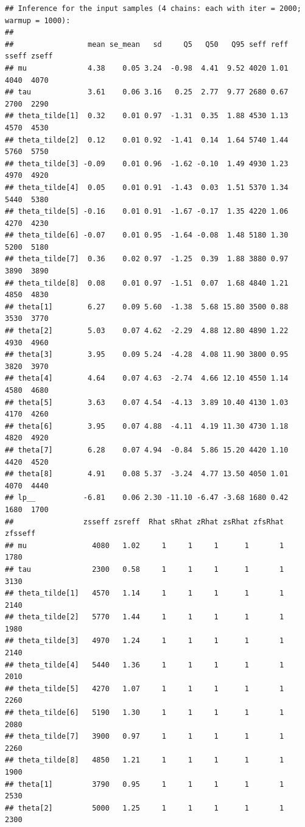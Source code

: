 \documentclass[american,]{article}
\begin{document}
\begin{verbatim}
## Inference for the input samples (4 chains: each with iter = 2000; warmup = 1000):
## 
##                 mean se_mean   sd     Q5   Q50   Q95 seff reff sseff zseff
## mu              4.38    0.05 3.24  -0.98  4.41  9.52 4020 1.01  4040  4070
## tau             3.61    0.06 3.16   0.25  2.77  9.77 2680 0.67  2700  2290
## theta_tilde[1]  0.32    0.01 0.97  -1.31  0.35  1.88 4530 1.13  4570  4530
## theta_tilde[2]  0.12    0.01 0.92  -1.41  0.14  1.64 5740 1.44  5760  5750
## theta_tilde[3] -0.09    0.01 0.96  -1.62 -0.10  1.49 4930 1.23  4970  4920
## theta_tilde[4]  0.05    0.01 0.91  -1.43  0.03  1.51 5370 1.34  5440  5380
## theta_tilde[5] -0.16    0.01 0.91  -1.67 -0.17  1.35 4220 1.06  4270  4230
## theta_tilde[6] -0.07    0.01 0.95  -1.64 -0.08  1.48 5180 1.30  5200  5180
## theta_tilde[7]  0.36    0.02 0.97  -1.25  0.39  1.88 3880 0.97  3890  3890
## theta_tilde[8]  0.08    0.01 0.97  -1.51  0.07  1.68 4840 1.21  4850  4830
## theta[1]        6.27    0.09 5.60  -1.38  5.68 15.80 3500 0.88  3530  3770
## theta[2]        5.03    0.07 4.62  -2.29  4.88 12.80 4890 1.22  4930  4960
## theta[3]        3.95    0.09 5.24  -4.28  4.08 11.90 3800 0.95  3820  3970
## theta[4]        4.64    0.07 4.63  -2.74  4.66 12.10 4550 1.14  4580  4680
## theta[5]        3.63    0.07 4.54  -4.13  3.89 10.40 4130 1.03  4170  4260
## theta[6]        3.95    0.07 4.88  -4.11  4.19 11.30 4730 1.18  4820  4920
## theta[7]        6.28    0.07 4.94  -0.84  5.86 15.20 4420 1.10  4420  4520
## theta[8]        4.91    0.08 5.37  -3.24  4.77 13.50 4050 1.01  4070  4440
## lp__           -6.81    0.06 2.30 -11.10 -6.47 -3.68 1680 0.42  1680  1700
##                zsseff zsreff  Rhat sRhat zRhat zsRhat zfsRhat zfsseff
## mu               4080   1.02     1     1     1      1       1    1780
## tau              2300   0.58     1     1     1      1       1    3130
## theta_tilde[1]   4570   1.14     1     1     1      1       1    2140
## theta_tilde[2]   5770   1.44     1     1     1      1       1    1980
## theta_tilde[3]   4970   1.24     1     1     1      1       1    2140
## theta_tilde[4]   5440   1.36     1     1     1      1       1    2010
## theta_tilde[5]   4270   1.07     1     1     1      1       1    2260
## theta_tilde[6]   5190   1.30     1     1     1      1       1    2080
## theta_tilde[7]   3900   0.97     1     1     1      1       1    2260
## theta_tilde[8]   4850   1.21     1     1     1      1       1    1900
## theta[1]         3790   0.95     1     1     1      1       1    2530
## theta[2]         5000   1.25     1     1     1      1       1    2300

\end{verbatim}
\end{document}
